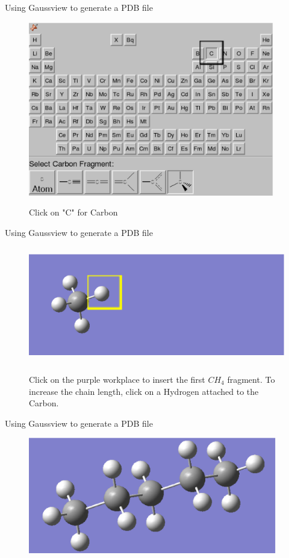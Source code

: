 \documentclass{beamer}
\begin{document}
\begin{frame}{Using Gaussview to generate a PDB file}
\begin{figure}
\begin{center}
\includegraphics[height=3in]{gaussian2final.eps}
\end{center}
Click on "C" for Carbon
\end{figure}
\end{frame}
\begin{frame}{Using Gaussview to generate a PDB file}
\begin{figure}
\begin{center}
\includegraphics[height=2in]{gaussian3final.eps}
\end{center}
Click on the purple workplace to insert the first $CH_4$ fragment. 
To increase the chain length, click on a Hydrogen attached to the 
Carbon.
\end{figure}
\end{frame}
\begin{frame}{Using Gaussview to generate a PDB file}
\begin{figure}
\begin{center}
\includegraphics[height=2in]{gaussian4final.eps}
\end{center}
\end{figure}
\end{frame}
\end{document}
